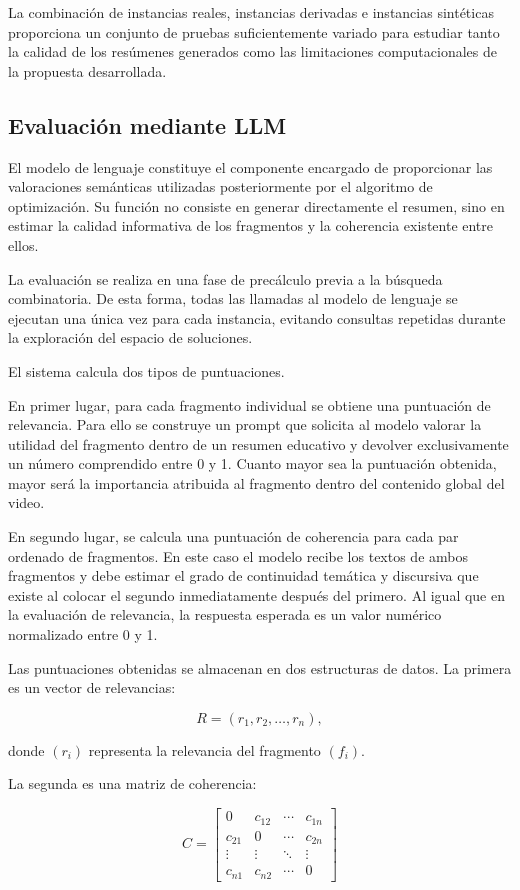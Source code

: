 \documentclass[12pt,a4paper]{article}
\begin{document}
La combinación de instancias reales, instancias derivadas e instancias sintéticas proporciona un conjunto de pruebas suficientemente variado para estudiar tanto la calidad de los resúmenes generados como las limitaciones computacionales de la propuesta desarrollada.


\subsection{Evaluación mediante LLM}

El modelo de lenguaje constituye el componente encargado de proporcionar las valoraciones semánticas utilizadas posteriormente por el algoritmo de optimización. Su función no consiste en generar directamente el resumen, sino en estimar la calidad informativa de los fragmentos y la coherencia existente entre ellos.

La evaluación se realiza en una fase de precálculo previa a la búsqueda combinatoria. De esta forma, todas las llamadas al modelo de lenguaje se ejecutan una única vez para cada instancia, evitando consultas repetidas durante la exploración del espacio de soluciones.

El sistema calcula dos tipos de puntuaciones.

En primer lugar, para cada fragmento individual se obtiene una puntuación de relevancia. Para ello se construye un prompt que solicita al modelo valorar la utilidad del fragmento dentro de un resumen educativo y devolver exclusivamente un número comprendido entre 0 y 1. Cuanto mayor sea la puntuación obtenida, mayor será la importancia atribuida al fragmento dentro del contenido global del video.

En segundo lugar, se calcula una puntuación de coherencia para cada par ordenado de fragmentos. En este caso el modelo recibe los textos de ambos fragmentos y debe estimar el grado de continuidad temática y discursiva que existe al colocar el segundo inmediatamente después del primero. Al igual que en la evaluación de relevancia, la respuesta esperada es un valor numérico normalizado entre 0 y 1.

Las puntuaciones obtenidas se almacenan en dos estructuras de datos. La primera es un vector de relevancias:

\[
R=(r_1,r_2,\ldots,r_n),
\]

donde $(r_i)$ representa la relevancia del fragmento $(f_i)$.

La segunda es una matriz de coherencia:

\[
C=
\begin{bmatrix}
0 & c_{12} & \cdots & c_{1n} \\
c_{21} & 0 & \cdots & c_{2n} \\
\vdots & \vdots & \ddots & \vdots \\
c_{n1} & c_{n2} & \cdots & 0
\end{bmatrix}
\]
\end{document}
